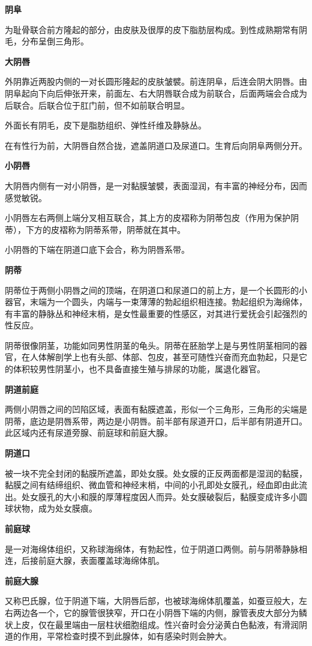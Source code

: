 \documentclass[12pt,UTF8]{ctexbook}
\begin{document}
\textbf{阴阜}

为耻骨联合前方隆起的部分，由皮肤及很厚的皮下脂肪层构成。到性成熟期常有阴毛，分布呈倒三角形。

\textbf{大阴唇}

外阴靠近两股内侧的一对长圆形隆起的皮肤皱襞。前连阴阜，后连会阴大阴唇。由阴阜起向下向后伸张开来，前面左、右大阴唇联合成为前联合，后面两端会合成为后联合。后联合位于肛门前，但不如前联合明显。

外面长有阴毛，皮下是脂肪组织、弹性纤维及静脉丛。

在有性行为前，大阴唇自然合拢，遮盖阴道口及尿道口。生育后向阴阜两侧分开。

\textbf{小阴唇}

大阴唇内侧有一对小阴唇，是一对黏膜皱襞，表面湿润，有丰富的神经分布，因而感觉敏锐。

小阴唇左右两侧上端分叉相互联合，其上方的皮褶称为阴蒂包皮（作用为保护阴蒂），下方的皮褶称为阴蒂系带，阴蒂就在其中。

小阴唇的下端在阴道口底下会合，称为阴唇系带。

\textbf{阴蒂}

阴蒂位于两侧小阴唇之间的顶端，在阴道口和尿道口的前上方，是一个长圆形的小器官，末端为一个圆头，内端与一束薄薄的勃起组织相连接。勃起组织为海绵体，有丰富的静脉丛和神经末梢，是女性最重要的性感区，对其进行爱抚会引起强烈的性反应。

阴蒂很像阴茎，功能如同男性阴茎的龟头。阴蒂在胚胎学上是与男性阴茎相同的器官，在人体解剖学上也有头部、体部、包皮，甚至可随性兴奋而充血勃起，只是它的体积较男性阴茎小，也不具备直接生殖与排尿的功能，属退化器官。

\textbf{阴道前庭}

两侧小阴唇之间的凹陷区域，表面有黏膜遮盖，形似一个三角形，三角形的尖端是阴蒂，底边是阴唇系带，两边是小阴唇。前半部有尿道开口，后半部有阴道开口。此区域内还有尿道旁腺、前庭球和前庭大腺。

\textbf{阴道口}

被一块不完全封闭的黏膜所遮盖，即处女膜。处女膜的正反两面都是湿润的黏膜，黏膜之间有结缔组织、微血管和神经末梢，中间的小孔即处女膜孔，经血即由此流出。处女膜孔的大小和膜的厚薄程度因人而异。处女膜破裂后，黏膜变成许多小圆球状物，成为处女膜痕。

\textbf{前庭球}

是一对海绵体组织，又称球海绵体，有勃起性，位于阴道口两侧。前与阴蒂静脉相连，后接前庭大腺，表面覆盖球海绵体肌。

\textbf{前庭大腺}

又称巴氏腺，位于阴道下端，大阴唇后部，也被球海绵体肌覆盖，如蚕豆般大，左右两边各一个，它的腺管很狭窄，开口在小阴唇下端的内侧，腺管表皮大部分为鳞状上皮，仅在最里端由一层柱状细胞组成。性兴奋时会分泌黄白色黏液，有滑润阴道的作用，平常检查时摸不到此腺体，如有感染时则会肿大。
\end{document}
